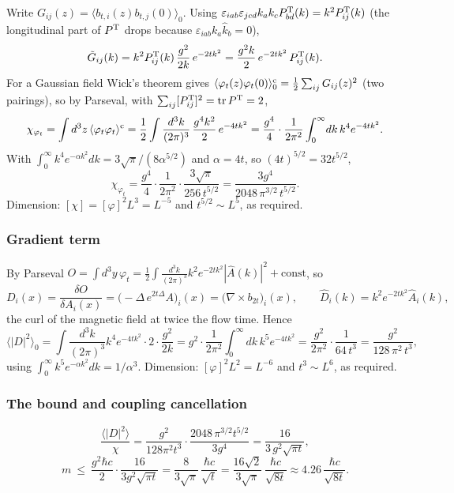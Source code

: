 \documentclass[11pt,a4paper]{article}
\begin{document}
Write \(G_{ij}(z)=\langle b_{t,i}(z)b_{t,j}(0)\rangle_0\). Using
\(\varepsilon_{iab}\varepsilon_{jcd}k_ak_cP^{\rm T}_{bd}(k)=k^2P^{\rm T}_{ij}(k)\)
(the longitudinal part of \(P^{\rm T}\) drops because
\(\varepsilon_{iab}k_a\hat k_b=0\)),
\[\tilde G_{ij}(k)=k^2P^{\rm T}_{ij}(k)\,\frac{g^2}{2k}\,e^{-2tk^2}
=\frac{g^2k}{2}\,e^{-2tk^2}\,P^{\rm T}_{ij}(k).\] For a Gaussian field
Wick's theorem gives
\(\langle\varphi_t(z)\varphi_t(0)\rangle^{\rm c}_0=\tfrac12\sum_{ij}G_{ij}(z)^2\)
(two pairings), so by Parseval, with
\(\sum_{ij}[P^{\rm T}_{ij}]^2=\operatorname{tr}P^{\rm T}=2\),
\[\chi_{\varphi_t}=\int d^3z\,\langle\varphi_t\varphi_t\rangle^{\rm c}
=\frac12\int\frac{d^3k}{(2\pi)^3}\,\frac{g^4k^2}{2}\,e^{-4tk^2}
=\frac{g^4}{4}\cdot\frac1{2\pi^2}\int_0^\infty\!dk\,k^4e^{-4tk^2}.\]
With \(\int_0^\infty k^4e^{-\alpha k^2}dk=3\sqrt\pi/(8\alpha^{5/2})\)
and \(\alpha=4t\), so \((4t)^{5/2}=32t^{5/2}\),
\[\chi_{\varphi_t}=\frac{g^4}{4}\cdot\frac1{2\pi^2}\cdot\frac{3\sqrt\pi}{256\,t^{5/2}}
=\frac{3g^4}{2048\,\pi^{3/2}\,t^{5/2}} .\] Dimension:
\([\chi]=[\varphi]^2L^3=L^{-5}\) and \(t^{5/2}\sim L^5\), as required.

\hypertarget{gradient-term}{%
\subsubsection{Gradient term}\label{gradient-term}}

By Parseval
\(O=\int d^3y\,\varphi_t=\tfrac12\int\frac{d^3k}{(2\pi)^3}k^2e^{-2tk^2}|\hat A(k)|^2+\text{const}\),
so
\[D_i(x)=\frac{\delta O}{\delta A_i(x)}=\big(-\Delta\,e^{2t\Delta}A\big)_i(x)
=\big(\nabla\times b_{2t}\big)_i(x),\qquad
\hat D_i(k)=k^2e^{-2tk^2}\hat A_i(k),\] the curl of the magnetic field
at twice the flow time. Hence
\[\big\langle|D|^2\big\rangle_0=\int\frac{d^3k}{(2\pi)^3}k^4e^{-4tk^2}\cdot2\cdot\frac{g^2}{2k}
=g^2\cdot\frac1{2\pi^2}\int_0^\infty\!dk\,k^5e^{-4tk^2}
=\frac{g^2}{2\pi^2}\cdot\frac1{64\,t^3}=\frac{g^2}{128\,\pi^2\,t^3},\]
using \(\int_0^\infty k^5e^{-\alpha k^2}dk=1/\alpha^3\). Dimension:
\([\varphi]^2L^2=L^{-6}\) and \(t^3\sim L^6\), as required.

\hypertarget{the-bound-and-coupling-cancellation}{%
\subsubsection{The bound and coupling
cancellation}\label{the-bound-and-coupling-cancellation}}

\[\frac{\langle|D|^2\rangle}{\chi}
=\frac{g^2}{128\pi^2t^3}\cdot\frac{2048\,\pi^{3/2}t^{5/2}}{3g^4}
=\frac{16}{3\,g^2\sqrt{\pi t}},\]
\[m\ \le\ \frac{g^2\hbar c}{2}\cdot\frac{16}{3g^2\sqrt{\pi t}}
=\frac{8}{3\sqrt\pi}\,\frac{\hbar c}{\sqrt t}
=\frac{16\sqrt2}{3\sqrt\pi}\,\frac{\hbar c}{\sqrt{8t}}\approx4.26\,\frac{\hbar c}{\sqrt{8t}} .\]
\end{document}
